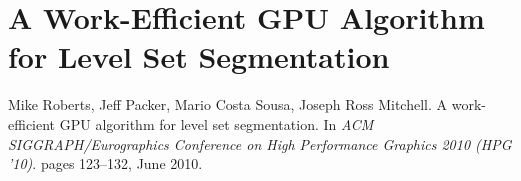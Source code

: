 \fancyhead[RO,LE]{\thepage}
\fancyfoot{} 
\chapter{A Work-Efficient GPU Algorithm for Level Set Segmentation}
\label{app:hpg}

Mike Roberts, Jeff Packer, Mario Costa Sousa, Joseph Ross Mitchell. A work-efficient GPU algorithm for level set segmentation. In \emph{ACM SIGGRAPH/Eurographics Conference on High Performance Graphics 2010 (HPG '10)}. pages 123--132, June 2010.

